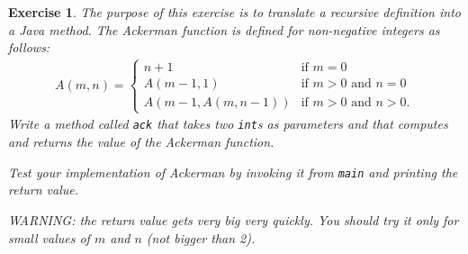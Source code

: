 \documentclass[12pt]{book}
\theoremstyle{exercise}
\newtheorem{exercise}{Exercise}[chapter]
\begin{document}
\begin{exercise}
The purpose of this exercise is to translate a recursive definition
into a Java method.  The Ackerman function is defined for non-negative
integers as follows:
%
\begin{eqnarray}
A(m, n) = \begin{cases}
              n+1 & \mbox{if } m = 0 \\
        A(m-1, 1) & \mbox{if } m > 0 \mbox{ and } n = 0 \\
A(m-1, A(m, n-1)) & \mbox{if } m > 0 \mbox{ and } n > 0.
\end{cases}
\end{eqnarray}
%
Write a method called {\tt ack} that takes two {\tt int}s as
parameters and that computes and returns the value
of the Ackerman function.

Test your implementation of Ackerman by invoking it
from {\tt main} and printing the return value.

WARNING: the return value gets very big very quickly.  You should try it
only for small values of $m$ and $n$ (not bigger than 2).

\end{exercise}
\end{document}
